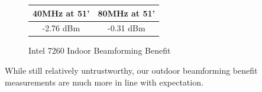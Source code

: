 \begin{figure}[h!]
\centering
\begin{tabular}{| c | c |}
\hline
40MHz at 51' & 80MHz at 51'\\ \hline
-2.76 dBm &  -0.31 dBm\\ \hline
\end{tabular}
\caption{Intel 7260 Indoor Beamforming Benefit}
\label{fig:intelindoorbeamresult}
\end{figure}

While still relatively untrustworthy, our outdoor beamforming benefit
measurements are much more in line with expectation.
